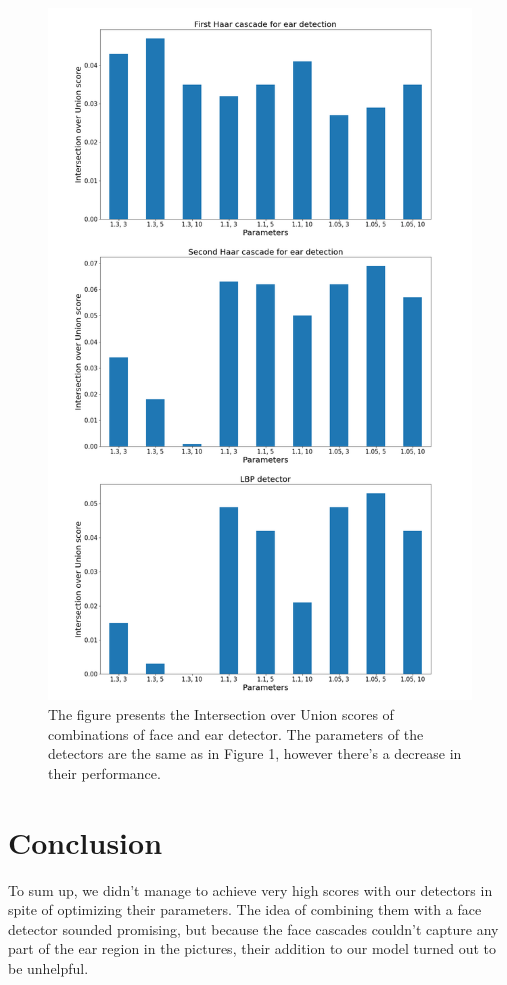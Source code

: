 \documentclass[9pt]{IEEEtran}
\begin{document}
\begin{figure}[h]
    \centering
    \includegraphics[width=1\columnwidth]{plot_2.2}
    \caption{The figure presents the Intersection over Union scores of combinations of face and ear detector. The parameters of the detectors are the same as in Figure 1, however there's a decrease in their performance.}
    \label{fig:plot_2.2}
\end{figure}

\section{Conclusion}
To sum up, we didn't manage to achieve very high scores with our detectors in spite of optimizing their parameters. The idea of combining them with a face detector sounded promising, but because the face cascades couldn't capture any part of the ear region in the pictures, their addition to our model turned out to be unhelpful. 
\end{document}

